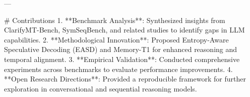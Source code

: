 ---

# Contributions  
1. **Benchmark Analysis**: Synthesized insights from ClarifyMT-Bench, SymSeqBench, and related studies to identify gaps in LLM capabilities.  
2. **Methodological Innovation**: Proposed Entropy-Aware Speculative Decoding (EASD) and Memory-T1 for enhanced reasoning and temporal alignment.  
3. **Empirical Validation**: Conducted comprehensive experiments across benchmarks to evaluate performance improvements.  
4. **Open Research Directions**: Provided a reproducible framework for further exploration in conversational and sequential reasoning models.  

